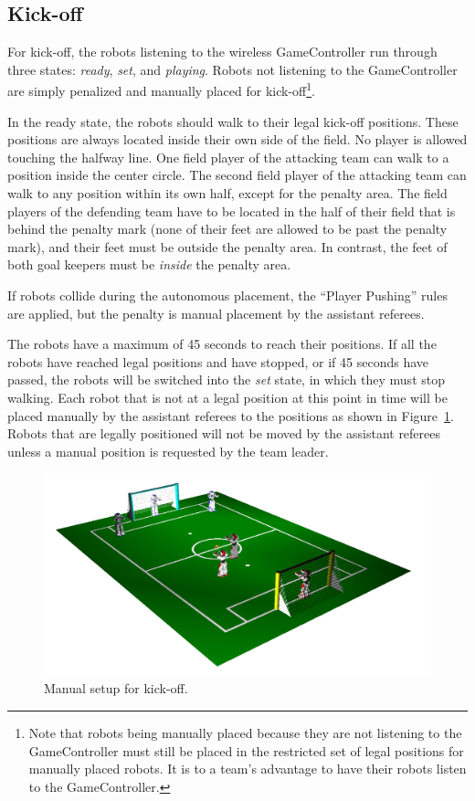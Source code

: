\documentclass[12pt]{article}
\newcommand{\KickOffAutoTime}{45 seconds\xspace}
\begin{document}
\subsection{Kick-off}
\label{sec:kick-off}

For kick-off, the robots listening to the wireless GameController run through three states: \emph{ready}, \emph{set}, and \emph{playing}. Robots not listening to the GameController are simply penalized and manually placed for kick-off\footnote{Note that robots being manually placed because they are not listening to the GameController must still be placed in the restricted set of legal positions for manually placed robots. It is to a team's advantage to have their robots listen to the GameController.}.

In the ready state, the robots should walk to their legal kick-off positions. These positions are always located inside their own side of the field. No player is allowed touching the halfway line. One field player of the attacking team can walk to a position inside the center circle. The second field player of the attacking team can walk to any position within its own half, except for the penalty area. The field players of the defending team have to be located in the half of their field that is behind the penalty mark (none of their feet are allowed to be past the penalty mark), and their feet must be outside the penalty area. In contrast, the feet of both goal keepers must be \emph{inside} the penalty area.

If robots collide during the autonomous placement, the ``Player Pushing'' rules are applied, but the penalty is manual placement by the assistant referees.

The robots have a maximum of \KickOffAutoTime to reach their positions. If all the robots have reached legal positions and have stopped, or if \KickOffAutoTime have passed, the robots will be switched into the \emph{set} state, in which they must stop walking. Each robot that is not at a legal position at this point in time will be placed manually by the assistant referees to the positions as shown in Figure~\ref{fig:ko}. Robots that are legally positioned will not be moved by the assistant referees unless a manual position is requested by the team leader.

\begin{figure}[t]
\centerline{\includegraphics[width=\columnwidth]{figs/manual_placement}}
\caption{Manual setup for kick-off.}
\label{fig:ko}
\end{figure}
\end{document}
